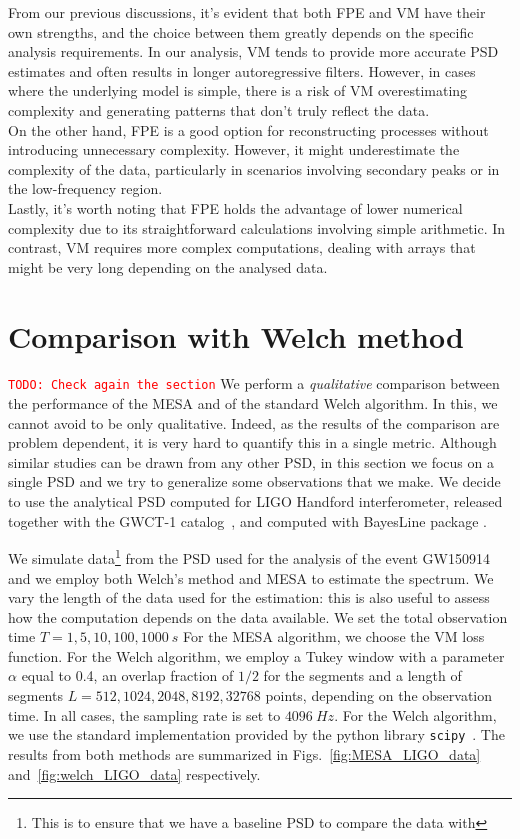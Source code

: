 \documentclass{aa}
\newcommand{\todo}[1]{{\textcolor{red}{\texttt{TODO: #1}} }}
\begin{document}
From our previous discussions, it's evident that both FPE and VM have their own strengths, and the choice between them greatly depends on the specific analysis requirements. In our analysis, VM tends to provide more accurate PSD estimates and often results in longer autoregressive filters. However, in cases where the underlying model is simple, there is a risk of VM overestimating complexity and generating patterns that don't truly reflect the data.\\ 
On the other hand, FPE is a good option for reconstructing processes without introducing unnecessary complexity. However, it might underestimate the complexity of the data, particularly in scenarios involving secondary peaks or in the low-frequency region.\\ 

Lastly, it's worth noting that FPE holds the advantage of lower numerical complexity due to its straightforward calculations involving simple arithmetic. In contrast, VM requires more complex computations, dealing with arrays that might be very long depending on the analysed data.

\section{Comparison with Welch method}\label{sec:Welch_comparison}
\todo{Check again the section}
We perform a {\it qualitative} comparison between the performance of the MESA and of the standard Welch algorithm.
In this, we cannot avoid to be only qualitative. Indeed, as the results of the comparison are problem dependent, it is very hard to quantify this in a single metric. Although similar studies can be drawn from any other PSD, in this section we focus on a single PSD and we try to generalize some observations that we make.
We decide to use the analytical PSD computed for LIGO Handford interferometer, released together with the GWCT-1 catalog~\citep{GWTC1, PSD_release}, and computed with BayesLine package \citep{Cornish_2015, Littenberg_2015, Cornish_2020, Chatziioannou_2019}.

We simulate data\footnote{This is to ensure that we have a baseline PSD to compare the data with} from the PSD used for the analysis of the event GW150914 and we employ both Welch's method and MESA to estimate the spectrum.
We vary the length of the data used for the estimation: this is also useful to assess how the computation depends on the data available. We set the total observation time $T = 1, 5, 10, 100, 1000 \SI{}{s}$
For the MESA algorithm, we choose the VM loss function. For the Welch algorithm, we employ a Tukey window with a parameter $\alpha$ 
equal to 0.4, an overlap fraction of $1/2$ for the segments and a length of 
segments $L = 512, 1024, 2048, 8192, 32768$ points, depending on the observation time.
In all cases, the sampling rate is set to $\SI{4096}{Hz}$.
For the Welch algorithm, we use the standard implementation provided by the python library \texttt{scipy}~\citep{numpy,scipy}.
The results from both methods are summarized in  Figs.~\ref{fig:MESA_LIGO_data} and~\ref{fig:welch_LIGO_data} respectively.
\end{document}
